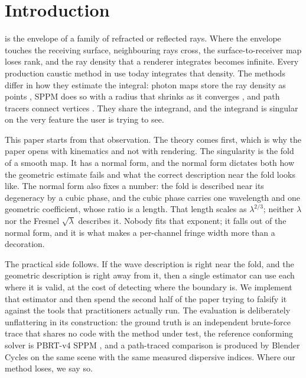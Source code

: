 \section{Introduction}
\label{sec:intro}

 is the envelope of a family of refracted or reflected rays. Where the
envelope touches the receiving surface, neighbouring rays cross, the
surface-to-receiver map loses rank, and the ray density that a renderer
integrates becomes infinite. Every production caustic method in use today
integrates that density. The methods differ in how they estimate the integral:
photon maps store the ray density as points \cite{jensen1996}, SPPM does so
with a radius that shrinks as it converges \cite{hachisuka2008}, and path tracers
connect vertices \cite{veach1997}. They share the integrand, and the
integrand is singular on the very feature the user is trying to see.

This paper starts from that observation. The theory comes first, which is why
the paper opens with kinematics and not with rendering. The singularity is the
fold of a smooth map. It has a normal form, and
the normal form dictates both how the geometric estimate fails and what the
correct description near the fold looks like. The normal form also fixes a
number: the fold
is described near its degeneracy by a cubic phase, and the cubic phase carries
one wavelength and one geometric coefficient, whose ratio is a length. That length scales as $\lambda^{2/3}$; neither $\lambda$ nor the Fresnel $\sqrt{\lambda}$ describes it. Nobody fits that exponent; it falls out of the normal form,
and it is what makes a per-channel fringe width more than a decoration.

The practical side follows. If the wave description is right near the
fold, and the geometric description is right away from it, then a single
estimator can use each where it is valid, at the cost of detecting where the
boundary is. We implement that estimator and then spend the second half of the
paper trying to falsify it against the tools that practitioners actually run.
The evaluation is deliberately unflattering in its construction: the ground
truth is an independent brute-force trace that shares no code with the method
under test, the reference conforming solver is PBRT-v4 SPPM \cite{pharr2023},
and a path-traced comparison is produced by Blender Cycles on the same scene
with the same measured dispersive indices. Where our method loses, we say so.

